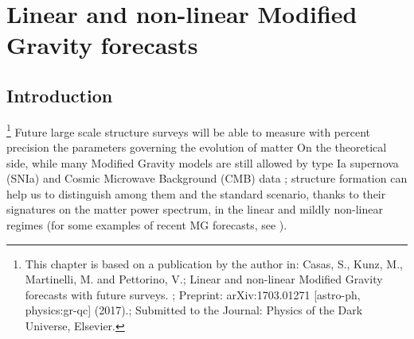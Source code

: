 \chapter{Linear and non-linear Modified Gravity forecasts \label{chap:MG-forecasts}}



\section{Introduction}

\done{}
\done{}
\footnote{This chapter is based on a publication by the author in: 
	Casas, S., Kunz, M., Martinelli, M. and Pettorino, V.;
	Linear and non-linear Modified Gravity forecasts with future surveys. ; Preprint: arXiv:1703.01271 [astro-ph, physics:gr-qc] (2017).; Submitted to the Journal: Physics of the Dark Universe, Elsevier.}
Future large scale structure surveys will be able to measure with
percent precision the parameters governing the evolution of matter
On the theoretical side, while many Modified Gravity models are still allowed by type Ia supernova (SNIa) and
Cosmic Microwave Background (CMB) data \cite{planck_collaboration_planck_2016}; structure formation can help us to distinguish among them and the standard scenario, thanks to their signatures on the matter power spectrum,
in the linear and mildly non-linear regimes (for some examples of recent MG forecasts, see \cite{amendola_cosmology_2013, casas_fitting_2015,  bielefeld_cosmological_2014}).

%

